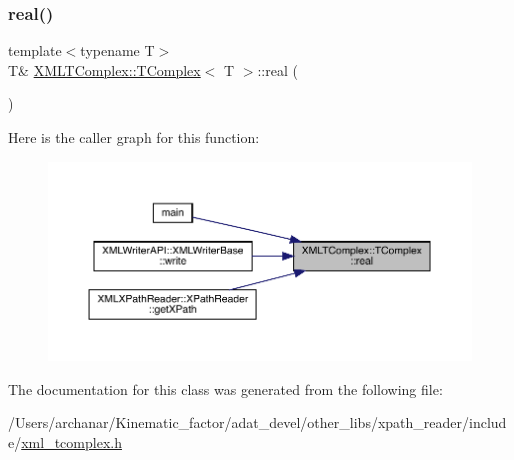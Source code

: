 \mbox{\label{classXMLTComplex_1_1TComplex_a3f7e9b8dd1c6a18da9a944d51d8118c9}} 
\subsubsection{\texorpdfstring{real()}{real()}\hspace{0.1cm}{\footnotesize\ttfamily [2/2]}}
{\footnotesize\ttfamily template$<$typename T$>$ \\
T\& \mbox{\hyperlink{classXMLTComplex_1_1TComplex}{X\+M\+L\+T\+Complex\+::\+T\+Complex}}$<$ T $>$\+::real (\begin{DoxyParamCaption}{ }\end{DoxyParamCaption})\hspace{0.3cm}{\ttfamily [inline]}}

Here is the caller graph for this function\+:\nopagebreak
\begin{figure}[H]
\begin{center}
\leavevmode
\includegraphics[width=350pt]{db/dbe/classXMLTComplex_1_1TComplex_a3f7e9b8dd1c6a18da9a944d51d8118c9_icgraph}
\end{center}
\end{figure}


The documentation for this class was generated from the following file\+:\begin{DoxyCompactItemize}
\item 
/\+Users/archanar/\+Kinematic\+\_\+factor/adat\+\_\+devel/other\+\_\+libs/xpath\+\_\+reader/include/\mbox{\hyperlink{other__libs_2xpath__reader_2include_2xml__tcomplex_8h}{xml\+\_\+tcomplex.\+h}}\end{DoxyCompactItemize}
